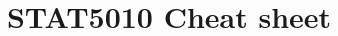 \documentclass[a4paper, 10pt]{article}
\title{STAT5010 Cheat sheet}
\begin{document}
\scriptsize

\pagestyle{empty}
\setlength{\abovedisplayskip}{0pt}
\setlength{\belowdisplayskip}{0pt}
\setlength{\abovedisplayshortskip}{0pt}
\setlength{\belowdisplayshortskip}{0pt}

\begin{multicols*}{2}
    
\end{multicols*}
\end{document}
